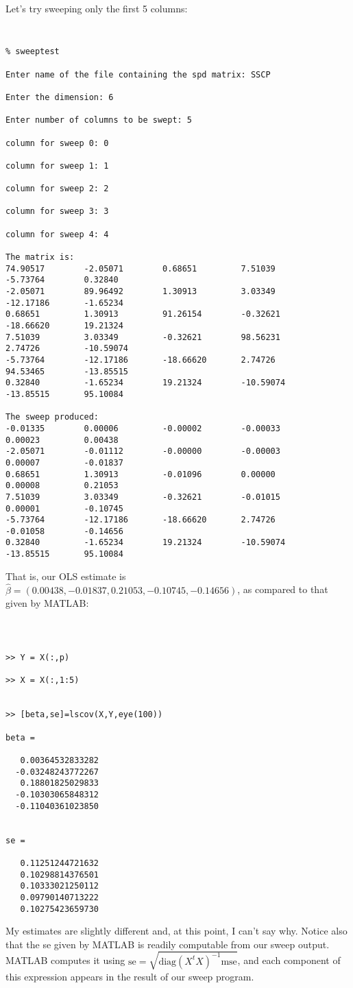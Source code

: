 \documentclass{article}
\begin{document}
Let's try sweeping only the first 5 columns:
{\tt
\begin{verbatim}
% sweeptest
 
Enter name of the file containing the spd matrix: SSCP
 
Enter the dimension: 6
 
Enter number of columns to be swept: 5
 
column for sweep 0: 0
 
column for sweep 1: 1
 
column for sweep 2: 2
 
column for sweep 3: 3
 
column for sweep 4: 4
 
The matrix is: 
74.90517        -2.05071        0.68651         7.51039         -5.73764        0.32840 
-2.05071        89.96492        1.30913         3.03349         -12.17186       -1.65234 
0.68651         1.30913         91.26154        -0.32621        -18.66620       19.21324 
7.51039         3.03349         -0.32621        98.56231        2.74726         -10.59074 
-5.73764        -12.17186       -18.66620       2.74726         94.53465        -13.85515 
0.32840         -1.65234        19.21324        -10.59074       -13.85515       95.10084 
 
The sweep produced: 
-0.01335        0.00006         -0.00002        -0.00033        0.00023         0.00438 
-2.05071        -0.01112        -0.00000        -0.00003        0.00007         -0.01837 
0.68651         1.30913         -0.01096        0.00000         0.00008         0.21053 
7.51039         3.03349         -0.32621        -0.01015        0.00001         -0.10745 
-5.73764        -12.17186       -18.66620       2.74726         -0.01058        -0.14656 
0.32840         -1.65234        19.21324        -10.59074       -13.85515       95.10084 
\end{verbatim}
}
That is, our OLS estimate is $\hat \beta =
(0.00438,-0.01837,0.21053,-0.10745,-0.14656)$,
as compared to that given by MATLAB:
{\tt
\begin{verbatim}

>> Y = X(:,p)

>> X = X(:,1:5)


>> [beta,se]=lscov(X,Y,eye(100)) 
 
beta =
 
   0.00364532833282
  -0.03248243772267
   0.18801825029833
  -0.10303065848312
  -0.11040361023850
 
 
se =
 
   0.11251244721632
   0.10298814376501
   0.10333021250112
   0.09790140713222
   0.10275423659730

\end{verbatim}
}
My estimates are slightly different and, at this point, I can't say
why. 
Notice also that the se given by MATLAB is readily computable from our
sweep output.  MATLAB computes it using 
$\mbox{se} = \sqrt{\mbox{diag}(X^tX)^{-1}\mbox{mse}}$, and each
component of this expression appears in the result of our sweep program.
\end{document}
